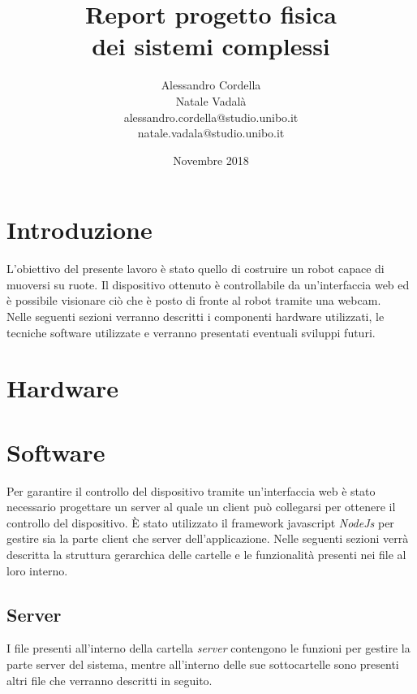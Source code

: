 \documentclass[11pt]{article}
\begin{document}
	\title{Report progetto fisica \\dei sistemi complessi\large}
	
	\author{Alessandro Cordella\large \\Natale Vadalà\\alessandro.cordella@studio.unibo.it\\natale.vadala@studio.unibo.it}
	\date{Novembre 2018}
	\maketitle
	\newpage
	\tableofcontents
	\newpage
\section{Introduzione}
L'obiettivo del presente lavoro è stato quello di costruire un robot capace di muoversi su ruote. Il dispositivo ottenuto è controllabile da un'interfaccia web ed è possibile visionare ciò che è posto di fronte al robot tramite una webcam.\\Nelle seguenti sezioni verranno descritti i componenti hardware utilizzati, le tecniche software utilizzate e verranno presentati eventuali sviluppi futuri.
\section{Hardware} 
\section{Software}
Per garantire il controllo del dispositivo tramite un'interfaccia web è stato necessario progettare un server al quale un client può collegarsi per ottenere il controllo del dispositivo. È stato utilizzato il framework javascript \textit{NodeJs} per gestire sia la parte client che server dell'applicazione. Nelle seguenti sezioni verrà descritta la struttura gerarchica delle cartelle e le funzionalità presenti nei file al loro interno.
\subsection{Server}
I file presenti all'interno della cartella \textit{server} contengono le funzioni per gestire la parte server del sistema, mentre all'interno delle sue sottocartelle sono presenti altri file che verranno descritti in seguito.\\
\end{document}
